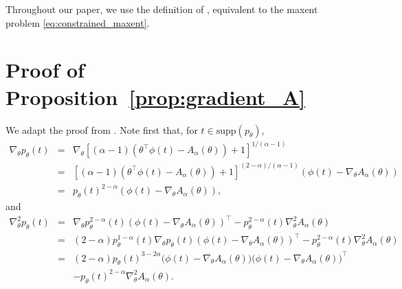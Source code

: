 \documentclass{article}
\begin{document}
Throughout our paper, we use the definition of \citep{naudts2009q,amari2011geometry}, equivalent to the maxent problem \eqref{eq:constrained_maxent}. 

\section{Proof of Proposition~\ref{prop:gradient_A}}\label{sec:proof_gradient_A}

We adapt the proof from \citet[Theorem 5]{amari2011geometry}. 
Note first that, for $t \in \mathrm{supp}(p_\theta)$,
\begin{eqnarray}
\nabla_\theta p_\theta(t) &=& \nabla_\theta [(\alpha-1)(\theta^\top \phi(t) - A_\alpha(\theta))+1]^{1/(\alpha-1)} \nonumber\\
&=&  [(\alpha-1)(\theta^\top \phi(t) - A_\alpha(\theta))+1]^{(2-\alpha)/(\alpha-1)} (\phi(t) - \nabla_\theta A_\alpha(\theta)) \nonumber\\
&=& p_\theta(t)^{2-\alpha} (\phi(t) - \nabla_\theta A_\alpha(\theta)),
\end{eqnarray}
and
\begin{eqnarray}
\nabla^2_\theta p_\theta(t) &=& 
\nabla_\theta p_\theta^{2-\alpha}(t) (\phi(t) - \nabla_\theta A_\alpha(\theta))^\top - p_\theta^{2-\alpha}(t) \nabla^2_\theta A_\alpha(\theta) \nonumber\\
&=& (2-\alpha) p_\theta^{1-\alpha}(t) \nabla_\theta  p_\theta(t) (\phi(t) - \nabla_\theta A_\alpha(\theta))^\top - p_\theta^{2-\alpha}(t) \nabla^2_\theta A_\alpha(\theta) \nonumber\\
&=& (2-\alpha)p_\theta(t)^{3-2\alpha}\bigl(\phi(t) - \nabla_\theta A_\alpha(\theta)\bigr) \bigl(\phi(t) - \nabla_\theta A_\alpha(\theta)\bigr)^\top \nonumber\\
&& - p_\theta(t)^{2-\alpha} \nabla^2_\theta A_\alpha(\theta).
\end{eqnarray}

\begin{comment}
and
\begin{eqnarray}
\int_S p_\theta^{\alpha - 1}(t) \nabla_\theta p_\theta^{2-\alpha}(t)  &=& (2-\alpha) \int_S p_\theta^{\alpha - 1}(t) p_\theta^{1-\alpha}(t)\nabla_\theta p_\theta(t) \nonumber\\
&=& (2-\alpha) \int_S \nabla_\theta p_\theta(t)
\nonumber\\
&=& (2-\alpha) \nabla_\theta 1 \nonumber\\
&=& 0.
\end{eqnarray}

\end{comment}
\end{document}
